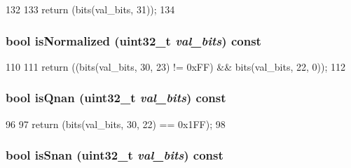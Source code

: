 \begin{DoxyCode}
132     {
133         return (bits(val_bits, 31));
134     }
\end{DoxyCode}
\hypertarget{classPowerISA_1_1FloatOp_a6d5c7457ddf585ba5f3e4889b6d462f3}{
\subsubsection[{isNormalized}]{\setlength{\rightskip}{0pt plus 5cm}bool isNormalized ({\bf uint32\_\-t} {\em val\_\-bits}) const}}
\label{classPowerISA_1_1FloatOp_a6d5c7457ddf585ba5f3e4889b6d462f3}



\begin{DoxyCode}
110     {
111         return ((bits(val_bits, 30, 23) != 0xFF) && bits(val_bits, 22, 0));
112     }
\end{DoxyCode}
\hypertarget{classPowerISA_1_1FloatOp_a6dc0371ab6b570e02b59e222333f00d5}{
\subsubsection[{isQnan}]{\setlength{\rightskip}{0pt plus 5cm}bool isQnan ({\bf uint32\_\-t} {\em val\_\-bits}) const}}
\label{classPowerISA_1_1FloatOp_a6dc0371ab6b570e02b59e222333f00d5}



\begin{DoxyCode}
96     {
97         return (bits(val_bits, 30, 22) == 0x1FF);
98     }
\end{DoxyCode}
\hypertarget{classPowerISA_1_1FloatOp_a250dfcca4b8f6c835e148def7dc24ca8}{
\subsubsection[{isSnan}]{\setlength{\rightskip}{0pt plus 5cm}bool isSnan ({\bf uint32\_\-t} {\em val\_\-bits}) const}}
\label{classPowerISA_1_1FloatOp_a250dfcca4b8f6c835e148def7dc24ca8}



